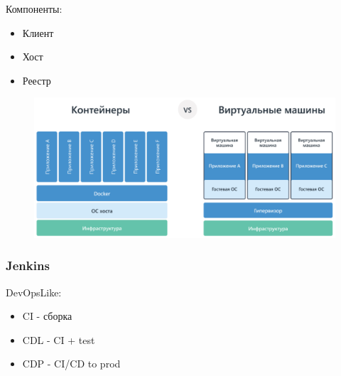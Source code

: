 Компоненты:
\begin{itemize}
    \item Клиент
    \item Хост
    \item Реестр
\end{itemize}

\begin{figure}[h]
	\centering
	\begin{minipage}[b]{0.8\textwidth}
		\includegraphics[width=\textwidth]{images/cvm.png}
	\end{minipage}
\end{figure}

\subsubsection*{Jenkins}


DevOpsLike:
\begin{itemize}
    \item CI - сборка
    \item CDL - CI + test
    \item CDP - CI/CD to prod
\end{itemize}
